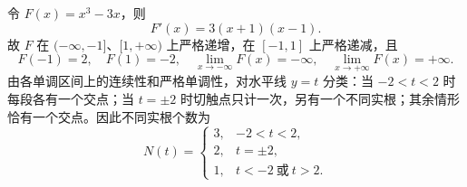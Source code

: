 令 $F(x)=x^3-3x$，则
\[
F'(x)=3(x+1)(x-1).
\]
故 $F$ 在 $(-\infty,-1]$、$[1,+\infty)$ 上严格递增，在 $[-1,1]$ 上严格递减，且
\[
F(-1)=2,\quad F(1)=-2,\quad
\lim_{x\to-\infty}F(x)=-\infty,\quad
\lim_{x\to+\infty}F(x)=+\infty.
\]
由各单调区间上的连续性和严格单调性，对水平线 $y=t$ 分类：当 $-2<t<2$ 时每段各有一个交点；当 $t=\pm2$ 时切触点只计一次，另有一个不同实根；其余情形恰有一个交点。因此不同实根个数为
\[
\boxed{N(t)=\begin{cases}
3,&-2<t<2,\\
2,&t=\pm2,\\
1,&t<-2\ \text{或}\ t>2.
\end{cases}}
\]
